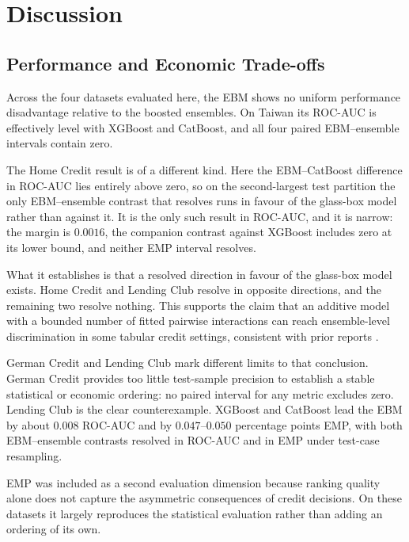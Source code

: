 \chapter{Discussion}\label{ch:discussion}


\section{Performance and Economic Trade-offs}

Across the four datasets evaluated here, the EBM shows no uniform performance
disadvantage relative to the boosted ensembles. On Taiwan its ROC-AUC is effectively
level with XGBoost and CatBoost, and all four paired EBM--ensemble intervals contain
zero.

The Home Credit result is of a different kind. Here the EBM--CatBoost difference in
ROC-AUC lies entirely above zero, so on the second-largest test partition the only
EBM--ensemble contrast that resolves runs in favour of the glass-box model rather than
against it. It is the only such result in ROC-AUC, and it is narrow: the margin is
$0.0016$, the companion contrast against XGBoost includes zero at its lower bound, and
neither EMP interval resolves.

What it establishes is that a resolved direction in favour of the glass-box model
exists. Home Credit and Lending Club resolve in opposite directions, and the remaining
two resolve nothing. This supports the claim that an additive
model with a bounded number of fitted pairwise interactions can reach ensemble-level
discrimination in some tabular credit settings, consistent with prior reports
\citep{changHowInterpretableTrustworthy2021, dessainCostExplainabilityAI2023}. 

German Credit and Lending Club mark different limits to that conclusion. German Credit
provides too little test-sample precision to establish a stable statistical or economic
ordering: no paired interval for any metric excludes zero. Lending Club is the clear counterexample. XGBoost and CatBoost
lead the EBM by about $0.008$ ROC-AUC and by $0.047$--$0.050$ percentage points EMP,
with both EBM--ensemble contrasts resolved in ROC-AUC and in EMP under test-case
resampling.


EMP was included as a second evaluation dimension because ranking quality alone does not
capture the asymmetric consequences of credit decisions. On these datasets it largely
reproduces the statistical evaluation rather than adding an ordering of its own.

